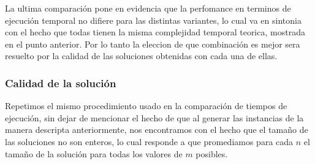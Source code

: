 La ultima comparación pone en evidencia que la perfomance en terminos de ejecución temporal no difiere para las distintas variantes, lo cual va en sintonia con el hecho que todas tienen la misma complejidad temporal teorica, mostrada en el punto anterior. Por lo tanto la eleccion de que combinación es mejor sera resuelto por la calidad de las soluciones obtenidas con cada una de ellas.
\subsubsection{Calidad de la solución}

Repetimos el mismo procedimiento usado en la comparación de tiempos de ejecución, sin dejar de mencionar el hecho de que al generar las instancias de la manera descripta anteriormente, nos encontramos con el hecho que el tamaño de las soluciones no son enteros, lo cual responde a que promediamos para cada $n$ el tamaño de la solución para todas los valores de $m$ posibles.

